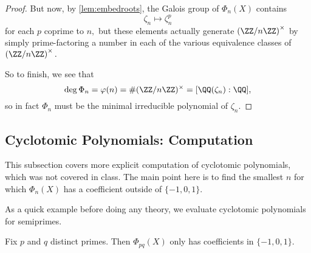 \begin{proof}
	But now, by \autoref{lem:embedroots}, the Galois group of $\Phi_n(X)$ contains
	\[\zeta_n\mapsto\zeta_n^p\]
	for each $p$ coprime to $n,$ but these elements actually generate $\left(\ZZ/n\ZZ\right)^\times$ by simply prime-factoring a number in each of the various equivalence classes of $\left(\ZZ/n\ZZ\right)^\times.$

	So to finish, we see that
	\[\deg\Phi_n=\varphi(n)=\#(\ZZ/n\ZZ)^\times=[\QQ(\zeta_n):\QQ],\]
	so in fact $\Phi_n$ must be the minimal irreducible polynomial of $\zeta_n.$
\end{proof}

\subsection{Cyclotomic Polynomials: Computation}
\begin{warn}
	This subsection covers more explicit computation of cyclotomic polynomials, which was not covered in class. The main point here is to find the smallest $n$ for which $\Phi_n(X)$ has a coefficient outside of $\{-1,0,1\}.$
\end{warn}
As a quick example before doing any theory, we evaluate cyclotomic polynomials for semiprimes.
\begin{exe}
	Fix $p$ and $q$ distinct primes. Then $\Phi_{pq}(X)$ only has coefficients in $\{-1,0,1\}.$
\end{exe}
